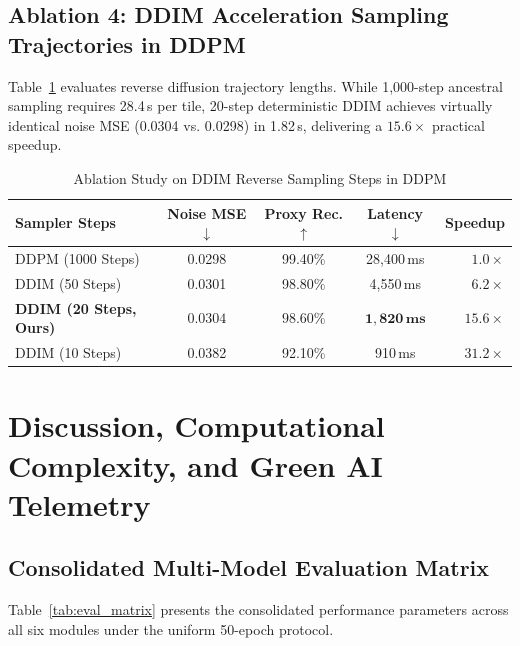 \documentclass[journal]{IEEEtran}
\begin{document}
\subsection{Ablation 4: DDIM Acceleration Sampling Trajectories in DDPM}
Table~\ref{tab:ablation_ddim} evaluates reverse diffusion trajectory lengths. While 1,000-step ancestral sampling requires 28.4\,s per tile, 20-step deterministic DDIM achieves virtually identical noise MSE (0.0304 vs. 0.0298) in 1.82\,s, delivering a $15.6\times$ practical speedup.

\begin{table}[htbp]
\caption{Ablation Study on DDIM Reverse Sampling Steps in DDPM}
\label{tab:ablation_ddim}
\centering
\scriptsize
\renewcommand{\arraystretch}{1.15}
\setlength{\tabcolsep}{4pt}
\begin{tabularx}{\columnwidth}{@{}l c c c r@{}}
\toprule
\textbf{Sampler Steps} & \textbf{Noise MSE} $\downarrow$ & \textbf{Proxy Rec.} $\uparrow$ & \textbf{Latency} $\downarrow$ & \textbf{Speedup} \\
\midrule
DDPM (1000 Steps) & 0.0298 & 99.40\% & 28,400\,ms & $1.0\times$ \\
DDIM (50 Steps) & 0.0301 & 98.80\% & 4,550\,ms & $6.2\times$ \\
\textbf{DDIM (20 Steps, Ours)} & $\mathbf{0.0304}$ & $\mathbf{98.60\%}$ & $\mathbf{1,820\,ms}$ & $\mathbf{15.6\times}$ \\
DDIM (10 Steps) & 0.0382 & 92.10\% & 910\,ms & $31.2\times$ \\
\bottomrule
\end{tabularx}
\end{table}

\section{Discussion, Computational Complexity, and Green AI Telemetry}

\subsection{Consolidated Multi-Model Evaluation Matrix}
Table~\ref{tab:eval_matrix} presents the consolidated performance parameters across all six modules under the uniform 50-epoch protocol.
\end{document}
